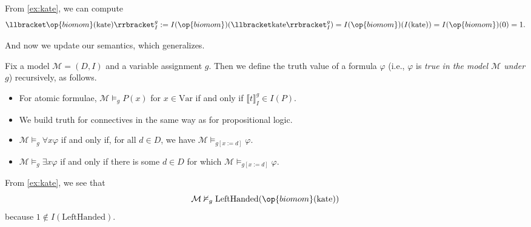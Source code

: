 \begin{example}
	From \autoref{ex:kate}, we can compute
	\[\llbracket\op{biomom}(\mathrm{kate})\rrbracket_I^g:=I(\op{biomom})(\llbracket \mathrm{kate}\rrbracket_I^g)=I(\op{biomom})(I(\mathrm{kate}))=I(\op{biomom})(0)=1.\]
\end{example}
And now we update our semantics, which generalizes.
\begin{defihelper}[Truth]
	Fix a model $\mathcal M=(D,I)$ and a variable assignment $g$. Then we define the truth value of a formula $\varphi$ (i.e., $\varphi$ is \textit{true in the model $\mathcal M$ under $g$}) recursively, as follows.
	\begin{itemize}
		\item For atomic formulae, $\mathcal M\models_gP(x)$ for $x\in\mathrm{Var}$ if and only if $\llbracket t\rrbracket_I^g\in I(P)$.
		\item We build truth for connectives in the same way as for propositional logic.
		\item $\mathcal M\models_g\forall x\varphi$ if and only if, for all $d\in D$, we have $\mathcal M\models_{g[x:=d]}\varphi$.
		\item $\mathcal M\models_g\exists x\varphi$ if and only if there is some $d\in D$ for which $\mathcal M\models_{g[x:=d]}\varphi$.
	\end{itemize}
\end{defihelper}
\begin{example}
	From \autoref{ex:kate}, we see that
	\[\mathcal M\nvDash_g\mathrm{LeftHanded}(\op{biomom}(\mathrm{kate}))\]
	because $1\notin I(\mathrm{LeftHanded})$.
\end{example}